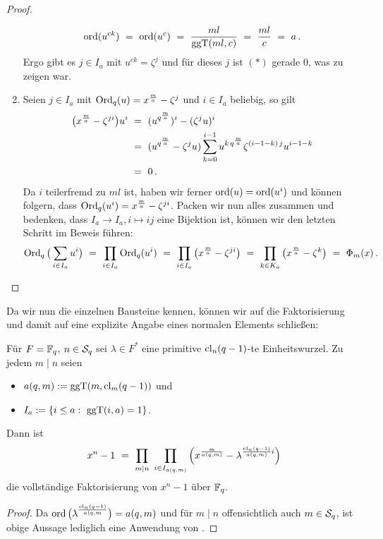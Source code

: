\begin{proof}
\begin{enumerate}
    \[ \ord(u^{ck}) \speq= \ord(u^c) \speq= \frac{ml}{\ggT(ml,c)}
      \speq= \frac{ml}{c} \speq= a\,.\]
    Ergo gibt es $j\in I_a$ mit $u^{ck} = \zeta^j$ und für dieses $j$ ist
    $(\ast)$ gerade $0$, was zu zeigen war.
  \item Seien $j\in I_a$ mit $\Ord_q(u) = x^\frac m a - \zeta^j$ und 
    $i\in I_a$ beliebig, so gilt
    \begin{align*}
      \big( x^\frac m a - \zeta^{ji} \big) u^i \speq{&=}
      (u^{q^\frac m a})^i - (\zeta^ju)^i \\
      \speq{&=} (u^{q^\frac m a} - \zeta^ju) 
        \sum_{k=0}^{i-1} u^{k\,q^\frac m a} \zeta^{(i-1-k)\,j}u^{i-1-k} \\
        \speq{&=} 0\,.
    \end{align*}
    Da $i$ teilerfremd zu $ml$ ist, haben wir ferner $\ord(u) = \ord(u^i)$ und
    können folgern, dass $\Ord_q(u^i) = x^\frac m a - \zeta^{ji}$.
    Packen wir nun alles zusammen und bedenken, dass
    $I_a \to I_a, i\mapsto ij$ eine Bijektion ist, können wir den letzten
    Schritt im Beweis führen:
    \[ \Ord_q\big( \sum_{i\in I_a} u^i \big)
      \speq= \prod_{i\in I_a} \Ord_q(u^i) \speq=
      \prod_{i \in I_a} \big( x^\frac m a - \zeta^{ji} \big)
      \speq= \prod_{k\in K_a} \big(x^\frac m a - \zeta^k \big)
      \speq= \Phi_m(x)\,.\]
  \end{enumerate}
\end{proof}

Da wir nun die einzelnen Bausteine kennen, können wir auf die Faktorisierung
und damit auf eine explizite Angabe eines normalen Elements schließen:

\begin{kor}
  \label{kor:konstruktion-q-ordnung}
  Für $F = \F_q$, $n\in \S_q$ sei $\lambda \in F^\ast$ eine primitive 
  $\cl_n(q-1)$-te Einheitswurzel. Zu jedem $m \mid n$ seien
  \begin{itemize}
    \item $a(q,m) := \ggT(m,\cl_m(q-1))$ und
    \item $I_a := \{ i\leq a:\ \ggT(i,a) = 1\}$.
  \end{itemize}
  Dann ist
  \[ x^n-1 \speq= \prod_{m\mid n}\ \prod_{i\in I_{a(q,m)}} 
    \left( x^\frac{m}{a(q,m)} - \lambda^{\frac{\cl_n(q-1)}{a(q,m)} i}\right)\]
  die vollständige Faktorisierung von $x^n-1$ über $\F_q$.
\end{kor}
\begin{proof}
  Da  $\ord\big(\lambda^{\frac{\cl_n(q-1)}{a(q,m}}\big) = a(q,m)$
  und für $m\mid n$ offensichtlich auch $m\in \S_q$, ist obige Aussage lediglich
  eine Anwendung von .
\end{proof}

